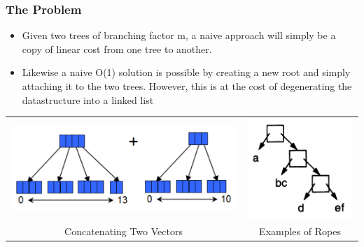 \documentclass{beamer}
\begin{document}
\begin{frame}
\frametitle{The Problem}

\begin{itemize}
	\item Given two trees of branching factor m, a naive approach will simply be a copy of linear cost from one tree to another. \pause
	\item Likewise a naive O(1) solution is possible by creating a new root and simply attaching it to the two trees. However, this is at the cost of degenerating the datastructure into a linked list\citep{boehm1995ropes} \pause

\end{itemize}

	\begin{center}
	\begin{tabular}{c c}
	\includegraphics[scale=0.3]{joinvectors.png} & \includegraphics[scale=0.3]{ropes.png}\\
	Concatenating Two Vectors & Examples of Ropes
	\end{tabular}	
	\end{center}

\end{frame}
\end{document}
